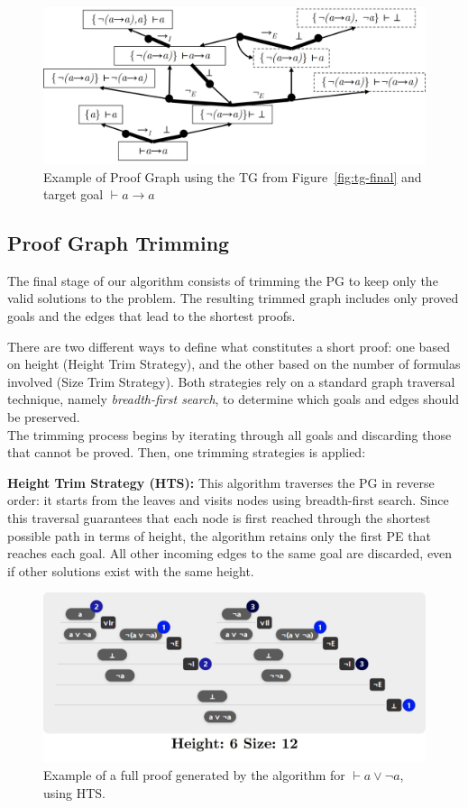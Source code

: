 \begin{figure}[h]
    \centering
    \includegraphics[width=0.8\linewidth]{resources/sg-gen.jpg}
    \caption{Example of Proof Graph using the TG from Figure~\ref{fig:tg-final} and target goal \(\vdash a \to a\)}
    \label{fig:st-ex}
\end{figure}

\subsection{Proof Graph Trimming}

The final stage of our algorithm consists of trimming the PG to keep only the valid solutions to the problem. The resulting trimmed graph includes only proved goals and the edges that lead to the shortest proofs.

There are two different ways to define what constitutes a short proof: one based on height (Height Trim Strategy), and the other based on the number of formulas involved (Size Trim Strategy). Both strategies rely on a standard graph traversal technique, namely \emph{breadth-first search}, to determine which goals and edges should be preserved.\\

The trimming process begins by iterating through all goals and discarding those that cannot be proved. Then, one trimming strategies is applied:
\vspace{1em}

\textbf{Height Trim Strategy (HTS):} This algorithm traverses the PG in reverse order: it starts from the leaves and visits nodes using breadth-first search. Since this traversal guarantees that each node is first reached through the shortest possible path in terms of height, the algorithm retains only the first PE that reaches each goal. All other incoming edges to the same goal are discarded, even if other solutions exist with the same height.

\begin{figure}
    \centering
    \includegraphics[width=0.6\linewidth]{resources/trim-height.jpg}
    \caption{Example of a full proof generated by the algorithm for \(\vdash a \vee \lnot a\), using HTS.}
    \label{fig:sg-trim-height}
\end{figure}

